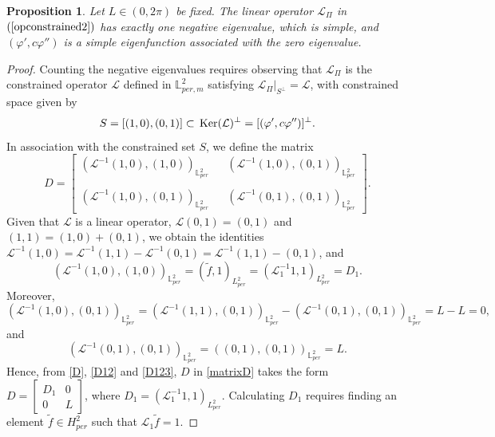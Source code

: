 \documentclass[12pt,reqno,a4paper]{amsart} %
\newcommand{\Ker}{{\rm \,Ker}}
\numberwithin{equation}{section}
\numberwithin{figure}{section}
\newtheorem{proposition}[theorem]{Proposition}
\begin{document}
 		\begin{proposition}\label{leman1}
 			Let $L\in (0,2\pi)$ be fixed. The linear operator $\mathcal{L}_{\Pi}$ in $(\ref{opconstrained2})$ has exactly one negative eigenvalue, which is simple, and $(\varphi',c\varphi'')$ is a simple eigenfunction associated with the zero eigenvalue. 
 		\end{proposition}
 		\begin{proof}
 			Counting the negative eigenvalues requires observing that $\mathcal{L}_{\Pi}$ is the constrained operator $\mathcal{L}$ defined in $\mathbb{L}_{per,m}^2$ satisfying $\mathcal{L}_{\Pi}|_{S^\perp}=\mathcal{L}$, with constrained space given by $$S= [(1,0),(0,1)] \subset \Ker(\mathcal{L})^{\perp}=[(\varphi',c\varphi'')]^\perp.$$
 			\indent In association with the constrained set $S$, we define the matrix
 			\begin{equation}\label{matrixD}
 				D=\left[\begin{array}{llll}(\mathcal{L}^{-1}(1,0),(1,0))_{\mathbb{L}^2_{per}}& & (\mathcal{L}^{-1}(1,0),(0,1))_{\mathbb{L}^2_{per}}\\\\
 					(\mathcal{L}^{-1}(1,0),(0,1))_{\mathbb{L}^2_{per}}& & (\mathcal{L}^{-1}(0,1),(0,1))_{\mathbb{L}^2_{per}}\end{array}\right].
 			\end{equation}
 			Given that $\mathcal{L}$ is a linear operator, $\mathcal{L}(0,1)=(0,1)$ and $(1,1)=(1,0)+(0,1)$, we obtain the identities $\mathcal{L}^{-1}(1,0)=\mathcal{L}^{-1}(1,1)-\mathcal{L}^{-1}(0,1)=\mathcal{L}^{-1}(1,1)-(0,1)$, and
 			\begin{equation}\label{D}
 				\left( \mathcal{L}^{-1}(1,0), (1,0) \right)_{\mathbb{L}^2_{per}}= (\tilde{f},1)_{L^2_{per}}  = ( \mathcal{L}_1^{-1} 1,1)_{L^2_{per}}=D_1.
 			\end{equation}
 			Moreover, 
 			\begin{equation}\label{D12}
 				\left( \mathcal{L}^{-1}(1,0), (0,1) \right)_{\mathbb{L}^2_{per}}=\left(\mathcal{L}^{-1}(1,1),(0,1)\right)_{\mathbb{L}^2_{per}}-\left(\mathcal{L}^{-1}(0,1),(0,1)
 				\right)_{\mathbb{L}^2_{per}}=L-L=0,\end{equation}
 			and 
 			\begin{equation}\label{D123}
 				\left( \mathcal{L}^{-1}(0,1), (0,1) \right)_{\mathbb{L}^2_{per}}=\left((0,1),(0,1)\right)_{\mathbb{L}^2_{per}}=L.\end{equation}
 			Hence, from \eqref{D}, \eqref{D12} and \eqref{D123}, $D$ in \eqref{matrixD} takes the form $D=\displaystyle\left[\begin{array}{cc}D_1&  0\\
 				0&  L\end{array}\right]$, where $D_1=(\mathcal{L}_{1}^{-1}1,1)_{L_{per}^2}$. Calculating $D_1$	requires finding an element $\tilde{f}\in H_{per}^2$ such that $\mathcal{L}_1\tilde{f}=1$.	
 			

\end{proof}
\end{document}
